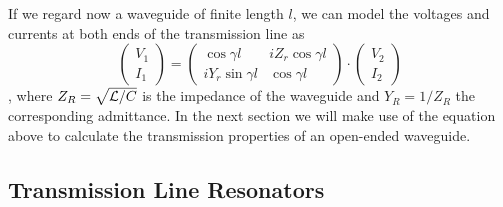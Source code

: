 \smallskip

If we regard now a waveguide of finite length $l$, we can model the voltages and currents at both ends of the transmission line as \citep{pozar_microwave_2011}
%
\begin{equation}
\left( \begin{array}{c} V_1 \\ I_1 \end{array}\right) = \left( 
		\begin{array}{cc}
			\cos{\gamma l} & iZ_r \cos{\gamma l} \\
			i Y_r \sin{\gamma l} & \cos{\gamma l}
		\end{array}
		\right) \cdot \left(
		\begin{array}{c}
			V_2 \\ I_2
		\end{array}
		\right) \label{eq:cpw_abcd_matrix}
\end{equation}
%
, where $Z_R=\sqrt{\begin{mathcal}L/C\end{mathcal}}$ is the impedance of the waveguide and $Y_R=1/Z_R$ the corresponding admittance. In the next section we will make use of the equation above to calculate the transmission properties of an open-ended waveguide.

\subsection{Transmission Line Resonators}

